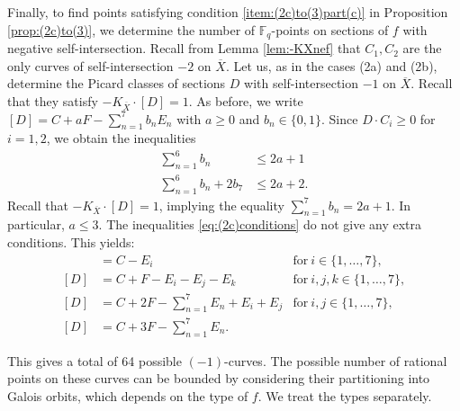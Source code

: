 \documentclass[a4paper, 11pt, reqno]{amsart}
\numberwithin{equation}{section} \numberwithin{figure}{section}
\def \F {{\mathbb F}}
\theoremstyle{definition}
\numberwithin{lemma}{section}
\begin{document}
Finally, to find points satisfying condition \ref{item:(2c)to(3)part(c)} in Proposition \ref{prop:(2c)to(3)}, we determine the number of $\F_q$-points on sections of $f$ with negative self-intersection. Recall from Lemma \ref{lem:-KXnef} that $C_1, C_2$ are the only curves of self-intersection $-2$ on $\overline{X}$. Let us, as in the cases (2a) and (2b), determine the Picard classes of sections $D$ with self-intersection $-1$ on $\overline{X}$. Recall that they satisfy $-K_{\overline{X}} \cdot [D] = 1$. As before, we write $[D] = C + aF - \sum_{n=1}^7 b_n E_n$ with $a \geq 0$ and $b_n \in \{0, 1\}$. Since $D \cdot C_i \geq 0$ for $i = 1, 2$, we obtain the inequalities
\begin{align}
    \sum_{n=1}^6 b_n &\leq 2a + 1 \nonumber\\
    \sum_{n=1}^6 b_n  + 2 b_7 &\leq 2a + 2. \label{eq:(2c)conditions}
\end{align}
Recall that $-K_{\overline{X}} \cdot [D] = 1$, implying the equality $\sum_{n = 1}^7 b_n = 2a+1$. In particular, $a \leq 3$. The inequalities \eqref{eq:(2c)conditions} do not give any extra conditions. This yields:
\begin{align}
    [D] &= C - E_i &\text{for} \ i \in \{ 1, \ldots, 7\},\nonumber\\
    [D] &= C + F - E_i - E_j - E_k &\text{for} \ i, j, k \in \{1, \ldots, 7\},\nonumber\\
    [D] &= C + 2F - \sum_{n=1}^7 E_n + E_i + E_j  &\text{for} \ i, j \in \{1, \ldots, 7\},\nonumber\\
    [D] &= C + 3F - \sum_{n=1}^7 E_n.\label{eq:(2c)sections-1}
\end{align}

This gives a total of 64 possible $(-1)$-curves. The possible number of rational points on these curves can be bounded by considering their partitioning into Galois orbits, which depends on the type of $f$. We treat the types separately.

\begin{comment}
     $7 + {7 \choose 3} + {7 \choose 2} + 1 = 64$
\end{comment}
\end{document}
